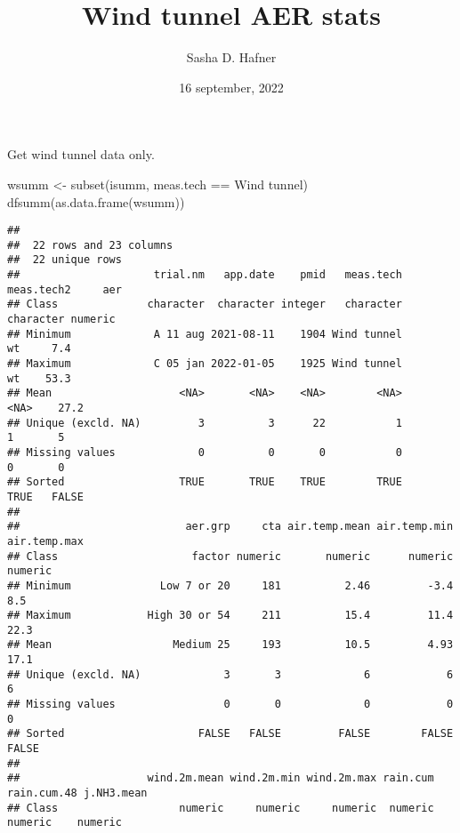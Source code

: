 \documentclass[
]{article}
\title{Wind tunnel AER stats}
\author{Sasha D. Hafner}
\date{16 september, 2022}
\newenvironment{Shaded}{\begin{snugshade}}{\end{snugshade}}
\newcommand{\FunctionTok}[1]{\textcolor[rgb]{0.00,0.00,0.00}{#1}}
\newcommand{\NormalTok}[1]{#1}
\newcommand{\OtherTok}[1]{\textcolor[rgb]{0.56,0.35,0.01}{#1}}
\newcommand{\SpecialCharTok}[1]{\textcolor[rgb]{0.00,0.00,0.00}{#1}}
\newcommand{\StringTok}[1]{\textcolor[rgb]{0.31,0.60,0.02}{#1}}
\begin{document}
\maketitle

Get wind tunnel data only.

\begin{Shaded}
\begin{Highlighting}[]
\NormalTok{wsumm }\OtherTok{\textless{}{-}} \FunctionTok{subset}\NormalTok{(isumm, meas.tech }\SpecialCharTok{==} \StringTok{\textquotesingle{}Wind tunnel\textquotesingle{}}\NormalTok{)}
\FunctionTok{dfsumm}\NormalTok{(}\FunctionTok{as.data.frame}\NormalTok{(wsumm))}
\end{Highlighting}
\end{Shaded}

\begin{verbatim}
## 
##  22 rows and 23 columns
##  22 unique rows
##                     trial.nm   app.date    pmid   meas.tech meas.tech2     aer
## Class              character  character integer   character  character numeric
## Minimum             A 11 aug 2021-08-11    1904 Wind tunnel         wt     7.4
## Maximum             C 05 jan 2022-01-05    1925 Wind tunnel         wt    53.3
## Mean                    <NA>       <NA>    <NA>        <NA>       <NA>    27.2
## Unique (excld. NA)         3          3      22           1          1       5
## Missing values             0          0       0           0          0       0
## Sorted                  TRUE       TRUE    TRUE        TRUE       TRUE   FALSE
##                                                                               
##                          aer.grp     cta air.temp.mean air.temp.min air.temp.max
## Class                     factor numeric       numeric      numeric      numeric
## Minimum              Low 7 or 20     181          2.46         -3.4          8.5
## Maximum            High 30 or 54     211          15.4         11.4         22.3
## Mean                   Medium 25     193          10.5         4.93         17.1
## Unique (excld. NA)             3       3             6            6            6
## Missing values                 0       0             0            0            0
## Sorted                     FALSE   FALSE         FALSE        FALSE        FALSE
##                                                                                 
##                    wind.2m.mean wind.2m.min wind.2m.max rain.cum rain.cum.48 j.NH3.mean
## Class                   numeric     numeric     numeric  numeric     numeric    numeric

\end{verbatim}
\end{document}
